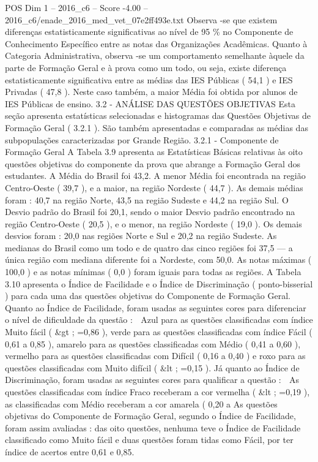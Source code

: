 \begin{textsample}{POS Dim 1 – 2016\_c6 – Score -4.00 – 2016\_c6/enade\_2016\_med\_vet\_07e2ff493e.txt}
Observa -se que existem diferenças estatisticamente significativas ao nível de 95 \% no Componente de Conhecimento Específico entre as notas das Organizações Acadêmicas.
Quanto à Categoria Administrativa, observa -se um comportamento semelhante àquele da parte de Formação Geral e à prova como um todo, ou seja, existe diferença estatisticamente significativa entre as médias das IES Públicas ( 54,1 ) e IES Privadas ( 47,8 ).
Neste caso também, a maior Média foi obtida por alunos de IES Públicas de ensino. 3.2 - ANÁLISE DAS QUESTÕES OBJETIVAS Esta seção apresenta estatísticas selecionadas e histogramas das Questões Objetivas de Formação Geral ( 3.2.1 ).
São também apresentadas e comparadas as médias das subpopulações caracterizadas por Grande Região. 3.2.1 - Componente de Formação Geral A Tabela 3.9 apresenta as Estatísticas Básicas relativas às oito questões objetivas do componente da prova que abrange a Formação Geral dos estudantes.
A Média do Brasil foi 43,2.
A menor Média foi encontrada na região Centro-Oeste ( 39,7 ), e a maior, na região Nordeste ( 44,7 ).
As demais médias foram : 40,7 na região Norte, 43,5 na região Sudeste e 44,2 na região Sul.
O Desvio padrão do Brasil foi 20,1, sendo o maior Desvio padrão encontrado na região Centro-Oeste ( 20,5 ), e o menor, na região Nordeste ( 19,0 ).
Os demais desvios foram : 20,0 nas regiões Norte e Sul e 20,2 na região Sudeste.
As medianas do Brasil como um todo e de quatro das cinco regiões foi 37,5 — a única região com mediana diferente foi a Nordeste, com 50,0.
As notas máximas ( 100,0 ) e as notas mínimas ( 0,0 ) foram iguais para todas as regiões.
A Tabela 3.10 apresenta o Índice de Facilidade e o Índice de Discriminação ( ponto-bisserial ) para cada uma das questões objetivas do Componente de Formação Geral.
Quanto ao Índice de Facilidade, foram usadas as seguintes cores para diferenciar o nível de dificuldade da questão :  Azul para as questões classificadas com índice Muito fácil ( \&gt ; =0,86 ), verde para as questões classificadas com índice Fácil ( 0,61 a 0,85 ), amarelo para as questões classificadas com Médio ( 0,41 a 0,60 ), vermelho para as questões classificadas com Difícil ( 0,16 a 0,40 ) e roxo para as questões classificadas com Muito difícil ( \&lt ; =0,15 ).
Já quanto ao Índice de Discriminação, foram usadas as seguintes cores para qualificar a questão :  As questões classificadas com índice Fraco receberam a cor vermelha ( \&lt ; =0,19 ), as classificadas com Médio receberam a cor amarela ( 0,20 a As questões objetivas do Componente de Formação Geral, segundo o Índice de Facilidade, foram assim avaliadas : das oito questões, nenhuma teve o Índice de Facilidade classificado como Muito fácil e duas questões foram tidas como Fácil, por ter índice de acertos entre 0,61 e 0,85.

\end{textsample}
